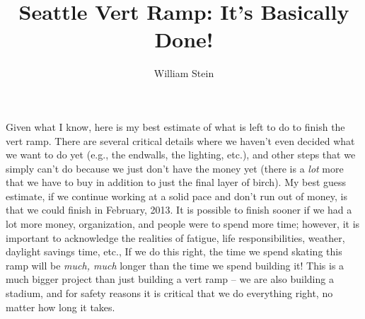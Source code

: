 \documentclass{article}
\title{Seattle Vert Ramp: It's Basically Done!}
\author{William Stein}
\begin{document}
\maketitle

Given what I know, here is my best estimate of what is left to do to
finish the vert ramp.  There are several critical details where we
haven't even decided what we want to do yet (e.g., the endwalls, the
lighting, etc.), and other steps that we simply can't do because we
just don't have the money yet (there is a {\em lot} more that we have
to buy in addition to just the final layer of birch).  My best guess
estimate, if we continue working at a solid pace and don't run out of
money, is that we could finish in February, 2013.  It is possible to
finish sooner if we had a lot more money, organization, and people
were to spend more time; however, it is important to acknowledge the
realities of fatigue, life responsibilities, weather, daylight savings
time, etc., If we do this right, the time we spend skating this ramp
will be {\em much, much} longer than the time we spend building it!
This is a much bigger project than just building a vert ramp -- we are
also building a stadium, and for safety reasons it is critical that we
do everything right, no matter how long it takes.
\end{document}
